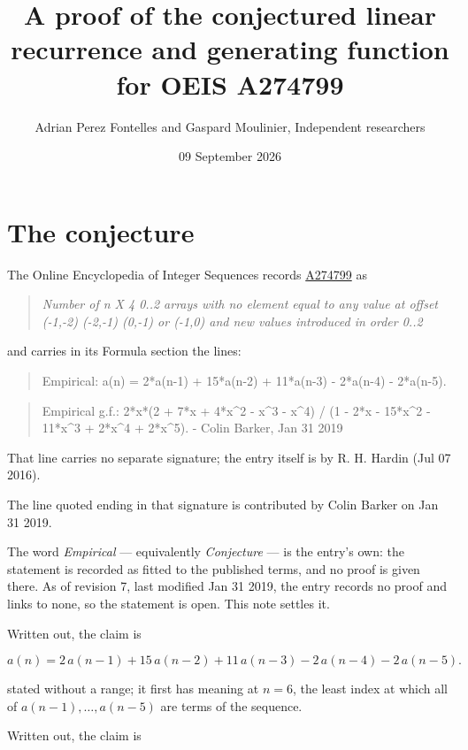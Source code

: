 \documentclass[11pt]{article}
\title{A proof of the conjectured linear recurrence and generating function for OEIS A274799}
\author{Adrian Perez Fontelles and Gaspard Moulinier, Independent researchers}
\date{09 September 2026}
\theoremstyle{definition}
\begin{document}
\maketitle
\section{The conjecture}

The Online Encyclopedia of Integer Sequences records \href{https://oeis.org/A274799}{A274799} as

\begin{quote}\itshape Number of n X 4 0..2 arrays with no element equal to any value at offset (-1,-2) (-2,-1) (0,-1) or (-1,0) and new values introduced in order 0..2\end{quote}

and carries in its Formula section the lines:

\begin{quote}\ttfamily Empirical: a(n) = 2*a(n-1) + 15*a(n-2) + 11*a(n-3) - 2*a(n-4) - 2*a(n-5).\end{quote}

\begin{quote}\ttfamily Empirical g.f.: 2*x*(2 + 7*x + 4*x\textasciicircum{}2 - x\textasciicircum{}3 - x\textasciicircum{}4) / (1 - 2*x - 15*x\textasciicircum{}2 - 11*x\textasciicircum{}3 + 2*x\textasciicircum{}4 + 2*x\textasciicircum{}5). - Colin Barker, Jan 31 2019\end{quote}

That line carries no separate signature; the entry itself is by R. H. Hardin (Jul 07 2016).

The line quoted ending in that signature is contributed by Colin Barker on Jan 31 2019.

The word {\itshape Empirical} --- equivalently {\itshape Conjecture} --- is the entry's own: the statement is recorded as fitted to the published terms, and no proof is given there. As of revision 7, last modified Jan 31 2019, the entry records no proof and links to none, so the statement is open. This note settles it.

Written out, the claim is

\[a(n) = 2\,a(n-1) + 15\,a(n-2) + 11\,a(n-3) - 2\,a(n-4) - 2\,a(n-5).\]

stated without a range; it first has meaning at $n = 6$, the least index at which all of $a(n-1),\dots,a(n-5)$ are terms of the sequence.

Written out, the claim is
\end{document}
